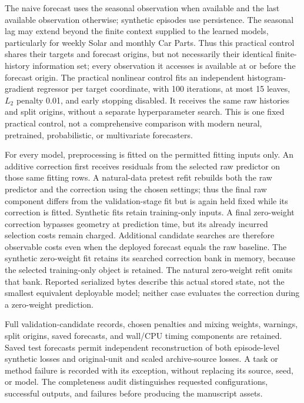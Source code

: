 The naive forecast uses the seasonal observation when available and the
last available observation otherwise; synthetic episodes use persistence.
The seasonal lag may extend beyond the finite context supplied to the
learned models, particularly for weekly Solar and monthly Car Parts.
Thus this practical control shares their targets and forecast origins,
but not necessarily their identical finite-history information set;
every observation it accesses is available at or before the forecast origin.
The practical nonlinear control fits an independent histogram-gradient
regressor per target coordinate, with 100 iterations, at most 15 leaves,
$L_2$ penalty 0.01, and early stopping disabled. It receives the same
raw histories and split origins, without a separate hyperparameter search.
This is one fixed practical control, not a comprehensive comparison with
modern neural, pretrained, probabilistic, or multivariate forecasters.

For every model, preprocessing is fitted on the permitted fitting inputs
only. An additive correction first receives residuals from the selected
raw predictor on those same fitting rows. A natural-data pretest refit
rebuilds both the raw predictor and the correction using the chosen
settings; thus the final raw component differs from the validation-stage
fit but is again held fixed while its correction is fitted. Synthetic
fits retain training-only inputs. A final zero-weight correction bypasses
geometry at prediction time, but its already incurred selection costs
remain charged. Additional candidate searches are therefore observable
costs even when the deployed forecast equals the raw baseline.
The synthetic zero-weight fit retains its searched correction bank in
memory, because the selected training-only object is retained. The natural
zero-weight refit omits that bank. Reported serialized bytes describe this
actual stored state, not the smallest equivalent deployable model;
neither case evaluates the correction during a zero-weight prediction.

Full validation-candidate records, chosen penalties and mixing weights,
warnings, split origins, saved forecasts, and wall/CPU timing components
are retained. Saved test forecasts permit independent reconstruction of
both episode-level synthetic losses and original-unit and scaled
archive-source losses. A task or method failure is recorded with its
exception, without replacing its source, seed, or model. The completeness audit distinguishes requested configurations,
successful outputs, and failures before producing the manuscript assets.

